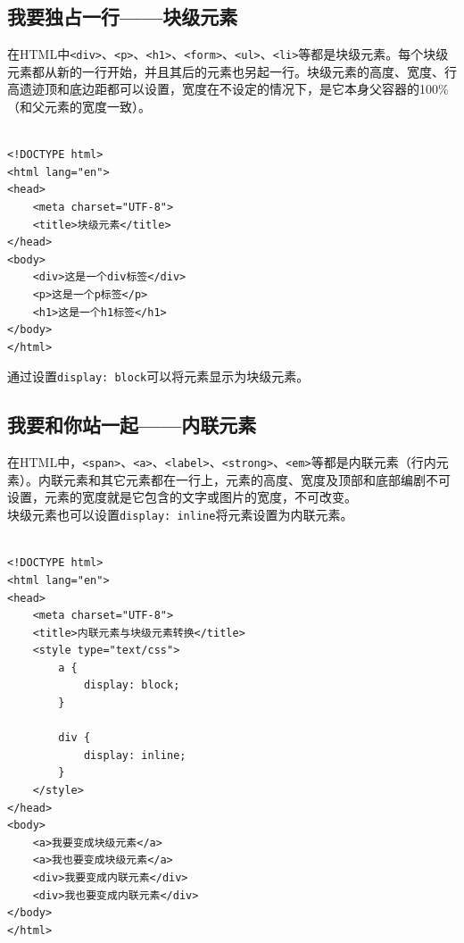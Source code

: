 \subsection{我要独占一行——块级元素}

在HTML中\lstinline|<div>|、\lstinline|<p>|、\lstinline|<h1>|、\lstinline|<form>|、\lstinline|<ul>|、\lstinline|<li>|等都是块级元素。每个块级元素都从新的一行开始，并且其后的元素也另起一行。块级元素的高度、宽度、行高遗迹顶和底边距都可以设置，宽度在不设定的情况下，是它本身父容器的100\%（和父元素的宽度一致）。 \\

 \\
\begin{lstlisting}[style=htmlcssjs]
<!DOCTYPE html>
<html lang="en">
<head>
    <meta charset="UTF-8">
    <title>块级元素</title>
</head>
<body>
    <div>这是一个div标签</div>
    <p>这是一个p标签</p>
    <h1>这是一个h1标签</h1>
</body>
</html>
\end{lstlisting}

通过设置\lstinline|display: block|可以将元素显示为块级元素。

\subsection{我要和你站一起——内联元素}

在HTML中，\lstinline|<span>|、\lstinline|<a>|、\lstinline|<label>|、\lstinline|<strong>|、\lstinline|<em>|等都是内联元素（行内元素）。内联元素和其它元素都在一行上，元素的高度、宽度及顶部和底部编剧不可设置，元素的宽度就是它包含的文字或图片的宽度，不可改变。 \\

块级元素也可以设置\lstinline|display: inline|将元素设置为内联元素。 \\

 \\
\begin{lstlisting}[style=htmlcssjs]
<!DOCTYPE html>
<html lang="en">
<head>
    <meta charset="UTF-8">
    <title>内联元素与块级元素转换</title>
    <style type="text/css">
        a {
            display: block;
        }

        div {
            display: inline;
        }
    </style>
</head>
<body>
    <a>我要变成块级元素</a>
    <a>我也要变成块级元素</a>
    <div>我要变成内联元素</div>
    <div>我也要变成内联元素</div>
</body>
</html>
\end{lstlisting}

